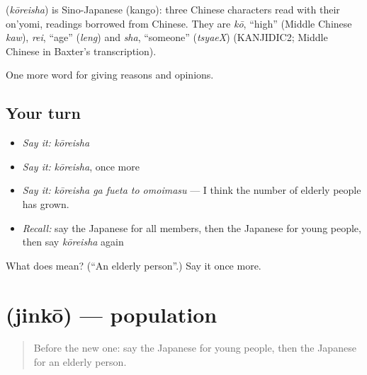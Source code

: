 \begin{cousinweb}
\textbf{} (\emph{kōreisha}) is Sino-Japanese (kango): three Chinese characters read with their on'yomi, readings borrowed from Chinese. They are \emph{kō}, \textquotedblleft{}high\textquotedblright{} (Middle Chinese \emph{kaw}), \emph{rei}, \textquotedblleft{}age\textquotedblright{} (\emph{leng}) and \emph{sha}, \textquotedblleft{}someone\textquotedblright{} (\emph{tsyaeX}) (KANJIDIC2; Middle Chinese in Baxter's transcription).
\end{cousinweb}

\begin{grammarlens}[title={What you've built}]
One more word for giving reasons and opinions.
\end{grammarlens}

\subsection*{Your turn}
\begin{itemize}
\raggedright
  \item \emph{Say it:} \emph{kōreisha}
  \item \emph{Say it:} \emph{kōreisha}, once more
  \item \emph{Say it:} \emph{kōreisha ga fueta to omoimasu} — I think the number of elderly people has grown.
  \item \emph{Recall:} say the Japanese for all members, then the Japanese for young people, then say \emph{kōreisha} again
\end{itemize}

\begin{tcolorbox}[breakable,colback=teal!4,colframe=teal!35!black,title={Before you move on}]
What does  mean? (\textquotedblleft{}An elderly person\textquotedblright{}.) Say it once more.
\end{tcolorbox}
\section[\texorpdfstring{\ja{じんこう} (jinkō)}{じんこう (jinkō)}]{ (jinkō) — population}

\label{lesson:JA-C333-jinkou}



\begin{quote}
Before the new one: say the Japanese for young people, then the Japanese for an elderly person.
\end{quote}


